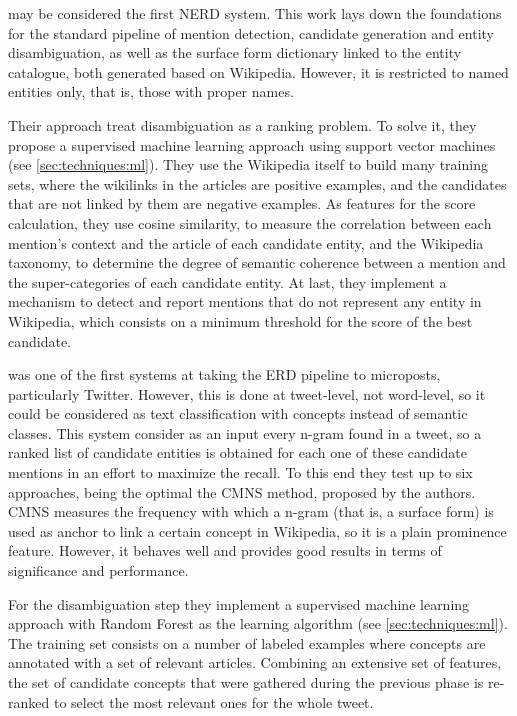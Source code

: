 \cite{bunescu2006} may be considered the first NERD system. This work lays down the foundations for the standard pipeline of mention detection, candidate generation and entity disambiguation, as well as the surface form dictionary linked to the entity catalogue, both generated based on Wikipedia. However, it is restricted to named entities only, that is, those with proper names.

Their approach treat disambiguation as a ranking problem. To solve it, they propose a supervised machine learning approach using support vector machines (see \autoref{sec:techniques:ml}). They use the Wikipedia itself to build many training sets, where the wikilinks in the articles are positive examples, and the candidates that are not linked by them are negative examples. As features for the score calculation, they use cosine similarity, to measure the correlation between each mention's context and the article of each candidate entity, and the Wikipedia taxonomy, to determine the degree of semantic coherence between a mention and the super-categories of each candidate entity. At last, they implement a mechanism to detect and report mentions that do not represent any entity in Wikipedia, which consists on a minimum threshold for the score of the best candidate.

\medskip

\cite{meij2012} was one of the first systems at taking the ERD pipeline to microposts, particularly Twitter. However, this is done at tweet-level, not word-level, so it could be considered as text classification with concepts instead of semantic classes. This system consider as an input every n-gram found in a tweet, so a ranked list of candidate entities is obtained for each one of these candidate mentions in an effort to maximize the recall. To this end they test up to six approaches, being the optimal the CMNS method, proposed by the authors. CMNS measures the frequency with which a n-gram (that is, a surface form) is used as anchor to link a certain concept in Wikipedia, so it is a plain prominence feature. However, it behaves well and provides good results in terms of significance and performance.

For the disambiguation step they implement a supervised machine learning approach with Random Forest as the learning algorithm (see \autoref{sec:techniques:ml}). The training set consists on a number of labeled examples where concepts are annotated with a set of relevant articles. Combining an extensive set of features, the set of candidate concepts that were gathered during the previous phase is re-ranked to select the most relevant ones for the whole tweet.

